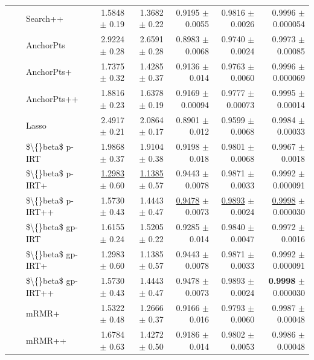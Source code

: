 \begin{longtable}{llp{}rrrrr}
 &  & Search++ & 1.5848 {\scriptsize $\pm$ 0.19} & 1.3682 {\scriptsize $\pm$ 0.22} & 0.9195 {\scriptsize $\pm$ 0.0055} & 0.9816 {\scriptsize $\pm$ 0.0026} & 0.9996 {\scriptsize $\pm$ 0.000054} \\
 &  & AnchorPts & 2.9224 {\scriptsize $\pm$ 0.28} & 2.6591 {\scriptsize $\pm$ 0.28} & 0.8983 {\scriptsize $\pm$ 0.0068} & 0.9740 {\scriptsize $\pm$ 0.0024} & 0.9973 {\scriptsize $\pm$ 0.00085} \\
 &  & AnchorPts+ & 1.7375 {\scriptsize $\pm$ 0.32} & 1.4285 {\scriptsize $\pm$ 0.37} & 0.9136 {\scriptsize $\pm$ 0.014} & 0.9763 {\scriptsize $\pm$ 0.0060} & 0.9996 {\scriptsize $\pm$ 0.000069} \\
 &  & AnchorPts++ & 1.8816 {\scriptsize $\pm$ 0.23} & 1.6378 {\scriptsize $\pm$ 0.19} & 0.9169 {\scriptsize $\pm$ 0.00094} & 0.9777 {\scriptsize $\pm$ 0.00073} & 0.9995 {\scriptsize $\pm$ 0.00014} \\
 &  & Lasso & 2.4917 {\scriptsize $\pm$ 0.21} & 2.0864 {\scriptsize $\pm$ 0.17} & 0.8901 {\scriptsize $\pm$ 0.012} & 0.9599 {\scriptsize $\pm$ 0.0068} & 0.9984 {\scriptsize $\pm$ 0.00033} \\
 &  & \$\textbackslash\{\}beta\$ p-IRT & 1.9868 {\scriptsize $\pm$ 0.37} & 1.9104 {\scriptsize $\pm$ 0.38} & 0.9198 {\scriptsize $\pm$ 0.018} & 0.9801 {\scriptsize $\pm$ 0.0068} & 0.9967 {\scriptsize $\pm$ 0.0018} \\
 &  & \$\textbackslash\{\}beta\$ p-IRT+ & \underline{1.2983} {\scriptsize $\pm$ 0.60} & \underline{1.1385} {\scriptsize $\pm$ 0.57} & 0.9443 {\scriptsize $\pm$ 0.0078} & 0.9871 {\scriptsize $\pm$ 0.0033} & 0.9992 {\scriptsize $\pm$ 0.000091} \\
 &  & \$\textbackslash\{\}beta\$ p-IRT++ & 1.5730 {\scriptsize $\pm$ 0.43} & 1.4443 {\scriptsize $\pm$ 0.47} & \underline{0.9478} {\scriptsize $\pm$ 0.0073} & \underline{0.9893} {\scriptsize $\pm$ 0.0024} & \underline{0.9998} {\scriptsize $\pm$ 0.000030} \\
 &  & \$\textbackslash\{\}beta\$ gp-IRT & 1.6155 {\scriptsize $\pm$ 0.24} & 1.5205 {\scriptsize $\pm$ 0.22} & 0.9285 {\scriptsize $\pm$ 0.014} & 0.9840 {\scriptsize $\pm$ 0.0047} & 0.9972 {\scriptsize $\pm$ 0.0016} \\
 &  & \$\textbackslash\{\}beta\$ gp-IRT+ & 1.2983 {\scriptsize $\pm$ 0.60} & 1.1385 {\scriptsize $\pm$ 0.57} & 0.9443 {\scriptsize $\pm$ 0.0078} & 0.9871 {\scriptsize $\pm$ 0.0033} & 0.9992 {\scriptsize $\pm$ 0.000091} \\
 &  & \$\textbackslash\{\}beta\$ gp-IRT++ & 1.5730 {\scriptsize $\pm$ 0.43} & 1.4443 {\scriptsize $\pm$ 0.47} & 0.9478 {\scriptsize $\pm$ 0.0073} & 0.9893 {\scriptsize $\pm$ 0.0024} & \textbf{0.9998} {\scriptsize $\pm$ 0.000030} \\
 &  & mRMR+ & 1.5322 {\scriptsize $\pm$ 0.48} & 1.2666 {\scriptsize $\pm$ 0.37} & 0.9166 {\scriptsize $\pm$ 0.016} & 0.9793 {\scriptsize $\pm$ 0.0060} & 0.9987 {\scriptsize $\pm$ 0.00048} \\
 &  & mRMR++ & 1.6784 {\scriptsize $\pm$ 0.63} & 1.4272 {\scriptsize $\pm$ 0.50} & 0.9186 {\scriptsize $\pm$ 0.014} & 0.9802 {\scriptsize $\pm$ 0.0053} & 0.9986 {\scriptsize $\pm$ 0.00048} \\
\end{longtable}